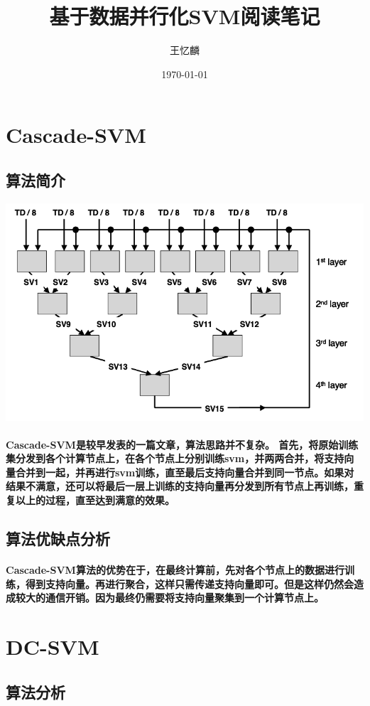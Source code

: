 \documentclass[UTF8]{ctexart}
\title{基于数据并行化SVM阅读笔记}
\author{王忆麟}
\date{\today}
\begin{document}
\maketitle
\section{Cascade-SVM}
\subsection{算法简介}
\includegraphics{cascade-svm.png}
\paragraph{
    Cascade-SVM是较早发表的一篇文章，算法思路并不复杂。
    首先，将原始训练集分发到各个计算节点上，在各个节点上分别训练svm，并两两合并，将支持向量合并到一起，并再进行svm训练，直至最后支持向量合并到同一节点。如果对结果不满意，还可以将最后一层上训练的支持向量再分发到所有节点上再训练，重复以上的过程，直至达到满意的效果。
}
\subsection{算法优缺点分析}
\paragraph{
    Cascade-SVM算法的优势在于，在最终计算前，先对各个节点上的数据进行训练，得到支持向量。再进行聚合，这样只需传递支持向量即可。但是这样仍然会造成较大的通信开销。因为最终仍需要将支持向量聚集到一个计算节点上。
}
\section{DC-SVM}
\subsection{算法分析}
\end{document}
